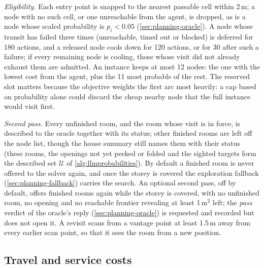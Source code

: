 \documentclass[10pt]{article}
\begin{document}
\emph{Eligibility.} Each entry point is snapped to the nearest passable cell within 2\,m; a node with no such cell, or one unreachable from the agent, is dropped, as is a node whose scaled probability is $p_i<0.05$ (\cref{sec:planning-oracle}). A node whose transit has failed three times (unreachable, timed out or blocked) is deferred for 180 actions, and a released node cools down for 120 actions, or for 30 after such a failure; if every remaining node is cooling, those whose visit did not already exhaust them are admitted. An instance keeps at most 12 nodes: the one with the lowest cost from the agent, plus the 11 most probable of the rest. The reserved slot matters because the objective weights the first arc most heavily: a cap based on probability alone could discard the cheap nearby node that the full instance would visit first.

\emph{Second pass.} Every unfinished room, and the room whose visit is in force, is described to the oracle together with its status; other finished rooms are left off the node list, though the house summary still names them with their status (these rooms, the openings not yet peeked or folded and the sighted targets form the described set $\mathcal{U}$ of \cref{alg:llmprobabilities}). By default a finished room is never offered to the solver again, and once the storey is covered the exploration fallback (\cref{sec:planning-fallback}) carries the search. An optional second pass, off by default, offers finished rooms again while the storey is covered, with no unfinished room, no opening and no reachable frontier revealing at least 1\,m$^2$ left; the \emph{pass} verdict of the oracle's reply (\cref{sec:planning-oracle}) is requested and recorded but does not open it. A revisit scans from a vantage point at least 1.5\,m away from every earlier scan point, so that it sees the room from a new position.

\subsection{Travel and service costs}
\label{sec:planning-costs}
\end{document}
